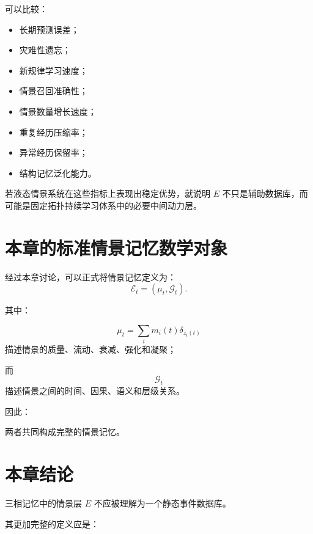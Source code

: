 可以比较：

\begin{itemize}
    \item 长期预测误差；
    \item 灾难性遗忘；
    \item 新规律学习速度；
    \item 情景召回准确性；
    \item 情景数量增长速度；
    \item 重复经历压缩率；
    \item 异常经历保留率；
    \item 结构记忆泛化能力。
\end{itemize}

若液态情景系统在这些指标上表现出稳定优势，就说明 $E$ 不只是辅助数据库，而可能是固定拓扑持续学习体系中的必要中间动力层。

\section{本章的标准情景记忆数学对象}

经过本章讨论，可以正式将情景记忆定义为：
\[
\boxed{
\mathcal{E}_t
=
\left(
\mu_t,
\mathcal{G}_t
\right).
}
\]

其中：

\[
\mu_t
=
\sum_i
m_i(t)
\delta_{z_i(t)}
\]
描述情景的质量、流动、衰减、强化和凝聚；

而
\[
\mathcal{G}_t
\]
描述情景之间的时间、因果、语义和层级关系。

因此：
\begin{statementbox}
\centering
{}
\end{statementbox}
\begin{statementbox}
\centering
{}
\end{statementbox}

两者共同构成完整的情景记忆。

\section{本章结论}

三相记忆中的情景层 $E$ 不应被理解为一个静态事件数据库。

其更加完整的定义应是：
\begin{statementbox}
\centering
{}
\end{statementbox}

